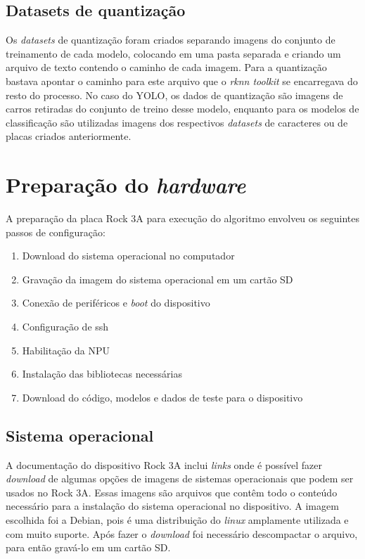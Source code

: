 \subsection{Datasets de quantização}
Os \textit{datasets} de quantização foram criados separando imagens do conjunto de treinamento de cada modelo, colocando em uma pasta separada e criando um arquivo de texto contendo o caminho de cada imagem. Para a quantização bastava apontar o caminho para este arquivo que o \textit{rknn toolkit} se encarregava do resto do processo. No caso do YOLO, os dados de quantização são imagens de carros retiradas do conjunto de treino desse modelo, enquanto para os modelos de classificação são utilizadas imagens dos respectivos \textit{datasets} de caracteres ou de placas criados anteriormente.

\section{Preparação do \textit{hardware}}
A preparação da placa Rock 3A para execução do algoritmo envolveu os seguintes passos de configuração:
\begin{enumerate} 
\item Download do sistema operacional no computador 
\item Gravação da imagem do sistema operacional em um cartão SD 
\item Conexão de periféricos e \textit{boot} do dispositivo 
\item Configuração de ssh 
\item Habilitação da NPU 
\item Instalação das bibliotecas necessárias 
\item Download do código, modelos e dados de teste para o dispositivo 
\end{enumerate}

\subsection{Sistema operacional}
A documentação do dispositivo Rock 3A inclui \textit{links} onde é possível fazer \textit{download} de algumas opções de imagens de sistemas operacionais que podem ser usados no Rock 3A. Essas imagens são arquivos que contêm todo o conteúdo necessário para a instalação do sistema operacional no dispositivo.
A imagem escolhida foi a Debian, pois é uma distribuição do \textit{linux} amplamente utilizada e com muito suporte. Após fazer o \textit{download} foi necessário descompactar o arquivo, para então gravá-lo em um cartão SD.

